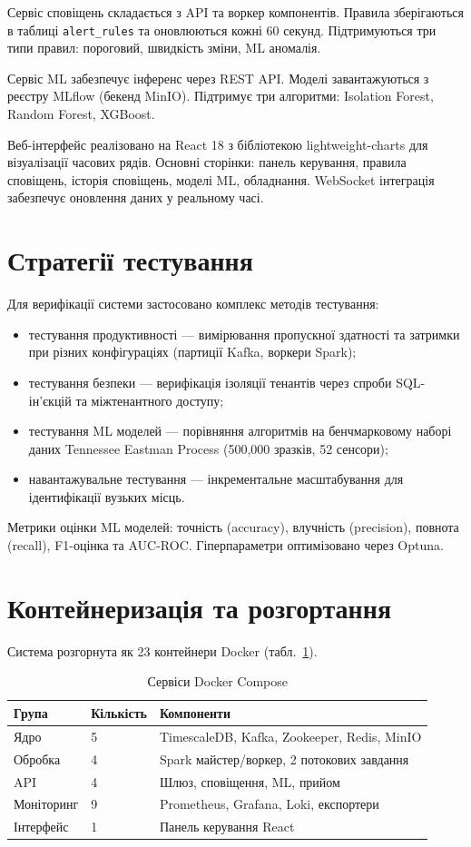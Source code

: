Сервіс сповіщень складається з API та воркер компонентів. Правила зберігаються в таблиці \texttt{alert\_rules} та оновлюються кожні 60 секунд. Підтримуються три типи правил: пороговий, швидкість зміни, ML аномалія.

Сервіс ML забезпечує інференс через REST API. Моделі завантажуються з реєстру MLflow (бекенд MinIO). Підтримує три алгоритми: Isolation Forest, Random Forest, XGBoost.

Веб-інтерфейс реалізовано на React 18 з бібліотекою lightweight-charts для візуалізації часових рядів. Основні сторінки: панель керування, правила сповіщень, історія сповіщень, моделі ML, обладнання. WebSocket інтеграція забезпечує оновлення даних у реальному часі.


\section{Стратегії тестування}

Для верифікації системи застосовано комплекс методів тестування:

\begin{itemize}
    \item тестування продуктивності --- вимірювання пропускної здатності та затримки при різних конфігураціях (партиції Kafka, воркери Spark);
    \item тестування безпеки --- верифікація ізоляції тенантів через спроби SQL-ін'єкцій та міжтенантного доступу;
    \item тестування ML моделей --- порівняння алгоритмів на бенчмарковому наборі даних Tennessee Eastman Process (500,000 зразків, 52 сенсори);
    \item навантажувальне тестування --- інкрементальне масштабування для ідентифікації вузьких місць.
\end{itemize}

Метрики оцінки ML моделей: точність (accuracy), влучність (precision), повнота (recall), F1-оцінка та AUC-ROC. Гіперпараметри оптимізовано через Optuna.


\section{Контейнеризація та розгортання}

Система розгорнута як 23 контейнери Docker (табл.~\ref{tab:docker_services}).

\begin{table}[h]
\caption{Сервіси Docker Compose}
\label{tab:docker_services}
\begin{tabular}{@{}llp{6cm}@{}}
\toprule
Група & Кількість & Компоненти \\
\midrule
Ядро & 5 & TimescaleDB, Kafka, Zookeeper, Redis, MinIO \\
Обробка & 4 & Spark майстер/воркер, 2 потокових завдання \\
API & 4 & Шлюз, сповіщення, ML, прийом \\
Моніторинг & 9 & Prometheus, Grafana, Loki, експортери \\
Інтерфейс & 1 & Панель керування React \\
\bottomrule
\end{tabular}
\end{table}

